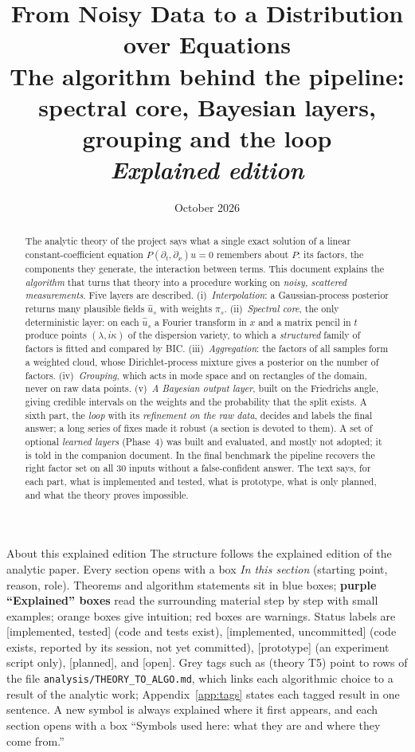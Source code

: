 \documentclass[11pt,a4paper]{article}
\title{\textbf{From Noisy Data to a Distribution over Equations}\\[4pt]
\large The algorithm behind the pipeline: spectral core, Bayesian layers, grouping and the loop\\[2pt]\normalsize\textit{Explained edition}}
\author{}
\date{October 2026}
\theoremstyle{definition}
\newcommand{\badge}[2]{\textcolor{#1}{\textsf{\footnotesize[#2]}}}
\newcommand{\openq}{\badge{cB}{open}}
\newcommand{\impl}{\badge{cC}{implemented, tested}}
\newcommand{\implu}{\badge{cD}{implemented, uncommitted}}
\newcommand{\proto}{\badge{cD}{prototype}}
\newcommand{\plan}{\badge{cB}{planned}}
\renewcommand{\openq}{\badge{cB}{open}}
\newcommand{\thy}[1]{\textcolor{cG}{\textsf{\footnotesize(theory #1)}}}
\begin{document}
\maketitle

\begin{abstract}
\noindent
The analytic theory of the project says what a single exact solution of a linear constant-coefficient equation $P(\partial_t,\partial_x)u=0$ remembers about $P$: its factors, the components they generate, the interaction between terms. This document explains the \emph{algorithm} that turns that theory into a procedure working on \emph{noisy, scattered measurements}. Five layers are described. (i)~\emph{Interpolation}: a Gaussian-process posterior returns many plausible fields $\hat u_s$ with weights $\pi_s$. (ii)~\emph{Spectral core}, the only deterministic layer: on each $\hat u_s$ a Fourier transform in $x$ and a matrix pencil in $t$ produce points $(\lambda,i\kappa)$ of the dispersion variety, to which a \emph{structured} family of factors is fitted and compared by BIC. (iii)~\emph{Aggregation}: the factors of all samples form a weighted cloud, whose Dirichlet-process mixture gives a posterior on the number of factors. (iv)~\emph{Grouping}, which acts in mode space and on rectangles of the domain, never on raw data points. (v)~\emph{A Bayesian output layer}, built on the Friedrichs angle, giving credible intervals on the weights and the probability that the split exists. A sixth part, the \emph{loop} with its \emph{refinement on the raw data}, decides and labels the final answer; a long series of fixes made it robust (a section is devoted to them). A set of optional \emph{learned layers} (Phase~4) was built and evaluated, and mostly not adopted; it is told in the companion document. In the final benchmark the pipeline recovers the right factor set on all $30$ inputs without a false-confident answer. The text says, for each part, what is implemented and tested, what is prototype, what is only planned, and what the theory proves impossible.
\end{abstract}

\tableofcontents

\begin{notebox}{About this explained edition}
The structure follows the explained edition of the analytic paper. Every section opens with a box \emph{In this section} (starting point, reason, role). Theorems and algorithm statements sit in blue boxes; \textbf{purple ``Explained'' boxes} read the surrounding material step by step with small examples; orange boxes give intuition; red boxes are warnings. Status labels are \impl{} (code and tests exist), \implu{} (code exists, reported by its session, not yet committed), \proto{} (an experiment script only), \plan{}, and \openq{}. Grey tags such as \thy{T5} point to rows of the file \texttt{analysis/THEORY\_TO\_ALGO.md}, which links each algorithmic choice to a result of the analytic work; Appendix~\ref{app:tags} states each tagged result in one sentence. A new symbol is always explained where it first appears, and each section opens with a box ``Symbols used here: what they are and where they come from.''
\end{notebox}
\bigskip
\end{document}
